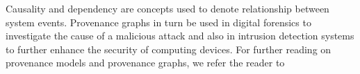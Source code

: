  


Causality and dependency are concepts used to denote relationship between system events. Provenance graphs in turn be used in digital forensics \cite{zhang_outlier_2010} to investigate the cause of a malicious attack and also in intrusion detection systems to further enhance the security of computing devices. For further reading on provenance models and provenance graphs, we refer the reader to \cite{}  


 





%
%



